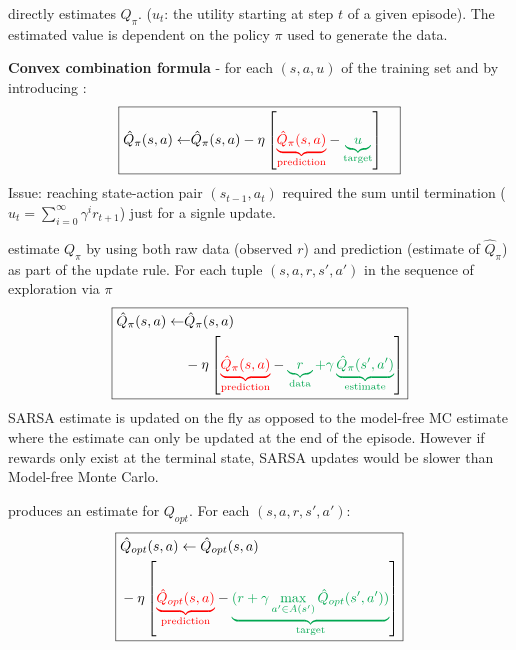  directly estimates $Q_\pi$.
($u_t$: the utility starting at step $t$ of a given episode).  The estimated
value is dependent on the policy $\pi$ used to generate the data.

\textbf{Convex combination formula} - for each $(s,a,u)$ of the training set and by
introducing :
\begin{displaymath}
\boxed{
\begin{aligned}
    \hat{Q}_\pi(s,a) \leftarrow & \hat{Q}_\pi(s,a) - \eta \left[
        \textcolor{red}{\underbrace{\hat{Q}_\pi(s,a)}_{\text{prediction}}}
        - \textcolor{Green}{\underbrace{u}_{\text{target}}}
    \right]
\end{aligned}
}
\end{displaymath}
Issue: reaching state-action pair $(s_{t-1}, a_t)$ required the sum until
termination ($u_t = \sum_{i=0}^{\infty}\gamma^i r_{t+1}$) just for a signle
update.

 estimate $Q_\pi$ by using both raw data (observed $r$) and
prediction (estimate of $\hat{Q}_\pi$) as part of the update rule. For each
tuple $(s,a,r,s',a')$ in the sequence of exploration via $\pi$
\begin{displaymath}
\boxed{
\begin{aligned}
    \hat{Q}_\pi(s,a) \leftarrow & \hat{Q}_\pi(s,a) \\
    &- \eta \left[
        \textcolor{red}{\underbrace{\hat{Q}_\pi(s,a)}_{\text{prediction}}}
        - \textcolor{Green}{\underbrace{r}_{\text{data}} + \gamma \underbrace{\hat{Q}_\pi(s',a')}_{\text{estimate}}}
    \right]
\end{aligned}
}
\end{displaymath}
SARSA estimate is updated on the fly as opposed to the model-free MC estimate
where the estimate can only be updated at the end of the episode. However if
rewards only exist at the terminal state, SARSA updates would be slower than
Model-free Monte Carlo.

 produces an estimate for $Q_{opt}$. For each
$(s,a,r,s',a')$:
\begin{displaymath}
\boxed{
\begin{aligned}
    &\hat{Q}_{opt}(s,a) \leftarrow \hat{Q}_{opt}(s,a) \\
    &- \eta \left[
        \textcolor{red}{\underbrace{\hat{Q}_{opt}(s,a)}_{\text{prediction}}}
        - \textcolor{Green}{\underbrace{(r + \gamma \max_{a' \in A(s')}\hat{Q}_{opt}(s',a'))}_{\text{target}}}
    \right]
\end{aligned}
}
\end{displaymath}

